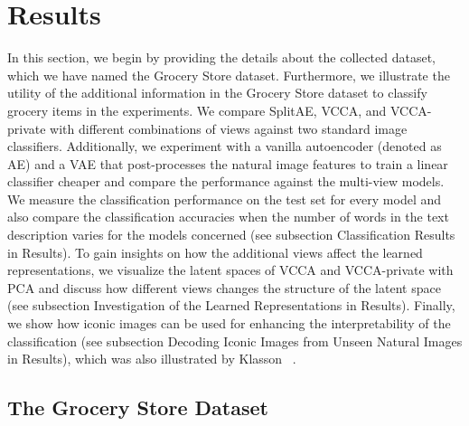 \section{Results}\label{paperB:sec:results}

In this section, we begin by providing the details about the collected dataset, which we have named the Grocery Store dataset. Furthermore, we illustrate the utility of the additional information in the Grocery Store dataset to classify grocery items in the experiments. We compare SplitAE, VCCA, and VCCA-private with different combinations of views against two standard image classifiers. Additionally, we experiment with a vanilla autoencoder (denoted as AE) and a VAE that post-processes the natural image features to train a linear classifier cheaper and compare the performance against the multi-view models. We measure the classification performance on the test set for every model and also compare the classification accuracies when the number of words in the text description varies for the models concerned (see subsection Classification Results in Results).
To gain insights on how the additional views affect the learned representations, we visualize the latent spaces of VCCA and VCCA-private with PCA and discuss how different views changes the structure of the latent space (see subsection Investigation of the Learned Representations in Results).
Finally, we show how iconic images can be used for enhancing the interpretability of the classification (see subsection Decoding Iconic Images from Unseen Natural Images in Results),
which was also illustrated by Klasson \etal~.


\subsection{The Grocery Store Dataset}
\label{paperB:sec:grocery_store_dataset}



